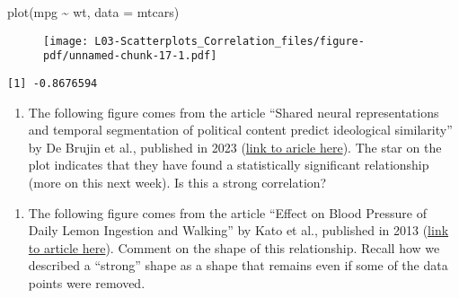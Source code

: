 \documentclass[
  letterpaper,
  DIV=11,
  numbers=noendperiod]{scrreprt}
\newenvironment{Shaded}{\begin{snugshade}}{\end{snugshade}}
\newcommand{\AttributeTok}[1]{\textcolor[rgb]{0.40,0.45,0.13}{#1}}
\newcommand{\FunctionTok}[1]{\textcolor[rgb]{0.28,0.35,0.67}{#1}}
\newcommand{\NormalTok}[1]{\textcolor[rgb]{0.00,0.23,0.31}{#1}}
\newcommand{\SpecialCharTok}[1]{\textcolor[rgb]{0.37,0.37,0.37}{#1}}
\providecommand{\tightlist}{%
  \setlength{\itemsep}{0pt}\setlength{\parskip}{0pt}}\usepackage{longtable,booktabs,array}
\begin{document}
\begin{Shaded}
\begin{Highlighting}[]
\FunctionTok{plot}\NormalTok{(mpg }\SpecialCharTok{\textasciitilde{}}\NormalTok{ wt, }\AttributeTok{data =}\NormalTok{ mtcars)}
\end{Highlighting}
\end{Shaded}

\begin{figure}[H]

{\centering \texttt{[image: L03-Scatterplots\_Correlation\_files/figure-pdf/unnamed-chunk-17-1.pdf]}

}

\end{figure}

\begin{Shaded}
\end{Shaded}

\begin{verbatim}
[1] -0.8676594
\end{verbatim}

\begin{enumerate}
\def\labelenumi{\arabic{enumi}.}
\setcounter{enumi}{1}
\tightlist
\item
  The following figure comes from the article ``Shared neural
  representations and temporal segmentation of political content predict
  ideological similarity'' by De Brujin et al., published in 2023
  (\href{https://www.science.org/doi/10.1126/sciadv.abq5920}{link to
  aricle here}). The star on the plot indicates that they have found a
  statistically significant relationship (more on this next week). Is
  this a strong correlation?
\end{enumerate}

\begin{enumerate}
\def\labelenumi{\arabic{enumi}.}
\setcounter{enumi}{2}
\tightlist
\item
  The following figure comes from the article ``Effect on Blood Pressure
  of Daily Lemon Ingestion and Walking'' by Kato et al., published in
  2013 (\href{https://www.hindawi.com/journals/jnme/2014/912684/}{link
  to article here}). Comment on the shape of this relationship. Recall
  how we described a ``strong'' shape as a shape that remains even if
  some of the data points were removed.
\end{enumerate}
\end{document}
